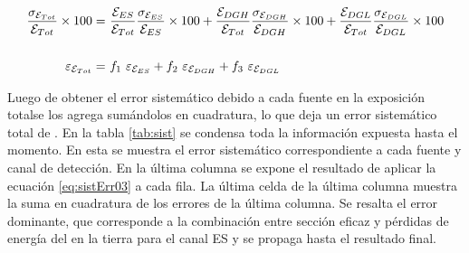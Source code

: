 	\begin{equation}
	\begin{aligned}
	\frac{\sigma_{{\cal E}_{Tot}}}{{\cal E}_{Tot}}\times 100 
	=&\ \frac{{\cal E}_{ES}}{{\cal E}_{Tot}} \frac{\sigma_{{\cal E}_{ES}}}{{\cal E}_{ES}} \times 100
	+ \frac{{\cal E}_{DGH}}{{\cal E}_{Tot}} \frac{\sigma_{{\cal E}_{DGH}}}{{\cal E}_{DGH}}\times 100
	+ \frac{{\cal E}_{DGL}}{{\cal E}_{Tot}} \frac{\sigma_{{\cal E}_{DGL}}}{{\cal E}_{DGL}}\times 100\\
	& \\
	\varepsilon_{{\cal E}_{Tot}}
	=&\ f_1\ \varepsilon_{{\cal E}_{ES}}
	+   f_2\ \varepsilon_{{\cal E}_{DGH}}
	+   f_3\ \varepsilon_{{\cal E}_{DGL}}
	\end{aligned}
	\label{eq:sistErr03}
	\end{equation}
	
	Luego de obtener el error sistemático debido a cada fuente en la exposición totalse los agrega sumándolos en cuadratura, lo que deja un error sistem\'atico total de .
	En la tabla \ref{tab:sist} se condensa toda la información expuesta hasta el momento.
	En esta se muestra el error sistemático correspondiente a cada fuente y canal de detección.
	En la última columna se expone el resultado de aplicar la ecuación \ref{eq:sistErr03} a cada fila.
	La última celda de la última columna muestra la suma en cuadratura de los errores de la última columna.
	Se resalta el error dominante, que corresponde a la combinación entre sección eficaz y pérdidas de energía del \tauon{} en la tierra para el canal ES y se propaga hasta el resultado final.
	
